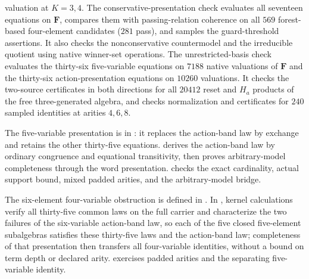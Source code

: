 valuation at $K=3,4$. The conservative-presentation check evaluates all
seventeen equations on $\mathbf F$, compares them with passing-relation
coherence on all $569$ forest-based four-element candidates ($281$ pass),
and samples the guard-threshold assertions. It also checks the
nonconservative countermodel and the irreducible quotient using native
winner-set operations. The unrestricted-basis check evaluates the thirty-six
five-variable equations on $7188$ native valuations of $\mathbf F$ and the
thirty-six action-presentation equations on $10260$ valuations. It checks
the two-source certificates in both directions for all $20412$ reset
and $H_a$ products of the free three-generated algebra, and checks
normalization and certificates for $240$ sampled identities at
arities $4,6,8$.

The five-variable presentation is  in
: it replaces the action-band law by
exchange and retains the other thirty-five equations.
 derives the action-band law by ordinary
congruence and equational transitivity, then proves arbitrary-model
completeness through the word presentation.
 checks the exact cardinality,
actual support bound, mixed padded arities, and the arbitrary-model bridge.

The six-element four-variable obstruction is defined in
. In
, kernel calculations verify
all thirty-five common laws on the full carrier and characterize the two
failures of the six-variable action-band law, so each of the five closed
five-element subalgebras satisfies these thirty-five laws and the action-band
law; completeness of that presentation then transfers all
four-variable identities, without a bound on term depth or declared arity.
 exercises padded arities and
the separating five-variable identity.

